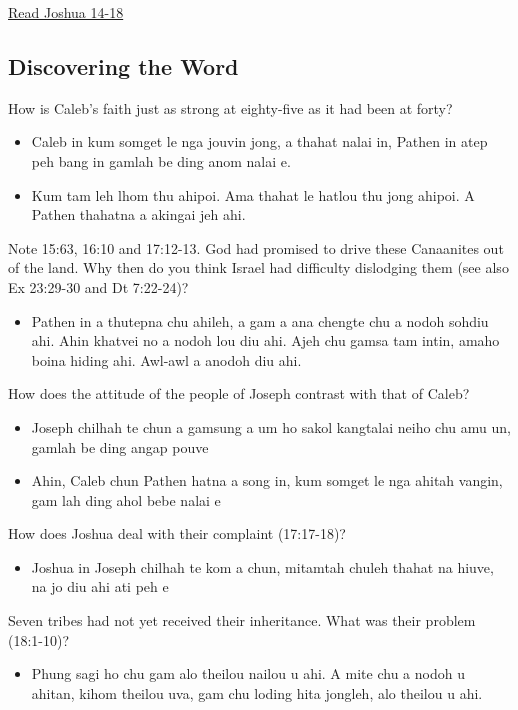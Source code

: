 \documentclass[11pt]{article}
\begin{document}
\href{https://www.biblegateway.com/passage/?search=Joshua\%2014-18\&version=NIV\&interface=print}{Read Joshua 14-18}

\subsection{Discovering the Word}
\label{sec:org7911ac5}

How is Caleb's faith just as strong at eighty-five as it had been at
forty?
\begin{itemize}
\item Caleb in kum somget le nga jouvin jong, a thahat nalai in, Pathen in
atep peh bang in gamlah be ding anom nalai e.

\item Kum tam leh lhom thu ahipoi. Ama thahat le hatlou thu jong ahipoi. A
Pathen thahatna a akingai jeh ahi.
\end{itemize}

Note 15:63, 16:10 and 17:12-13. God had promised to drive these
Canaanites out of the land. Why then do you think Israel had
difficulty dislodging them (see also Ex 23:29-30 and Dt 7:22-24)?
\begin{itemize}
\item Pathen in a thutepna chu ahileh, a gam a ana chengte chu a nodoh
sohdiu ahi. Ahin khatvei no a nodoh lou diu ahi. Ajeh chu gamsa tam
intin, amaho boina hiding ahi. Awl-awl a anodoh diu ahi.
\end{itemize}

How does the attitude of the people of Joseph contrast with that of
Caleb?
\begin{itemize}
\item Joseph chilhah te chun a gamsung a um ho sakol kangtalai neiho chu
amu un, gamlah be ding angap pouve
\item Ahin, Caleb chun Pathen hatna a song in, kum somget le nga ahitah
vangin, gam lah ding ahol bebe nalai e
\end{itemize}

How does Joshua deal with their complaint (17:17-18)?
\begin{itemize}
\item Joshua in Joseph chilhah te kom a chun, mitamtah chuleh thahat na
hiuve, na jo diu ahi ati peh e
\end{itemize}

Seven tribes had not yet received their inheritance. What was their
problem (18:1-10)?
\begin{itemize}
\item Phung sagi ho chu gam alo theilou nailou u ahi. A mite chu a nodoh u
ahitan, kihom theilou uva, gam chu loding hita jongleh, alo theilou
u ahi.
\end{itemize}
\end{document}

